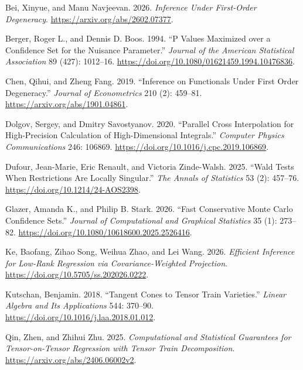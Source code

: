 \documentclass[
  11pt,
]{article}
\newlength{\cslhangindent}
\newenvironment{CSLReferences}[2] %
 {\begin{list}{}{%
  \setlength{\itemindent}{0pt}
  \setlength{\leftmargin}{0pt}
  \setlength{\parsep}{0pt}
  \ifodd #1
   \setlength{\leftmargin}{\cslhangindent}
   \setlength{\itemindent}{-1\cslhangindent}
  \fi
  \setlength{\itemsep}{#2\baselineskip}}}
 {\end{list}}
\begin{document}
\protect{}\label{refs}
\begin{CSLReferences}{1}{1}
Bei, Xinyue, and Manu Navjeevan. 2026. \emph{Inference Under First-Order
Degeneracy}. \url{https://arxiv.org/abs/2602.07377}.

Berger, Roger L., and Dennis D. Boos. 1994. {``P Values Maximized over a
Confidence Set for the Nuisance Parameter.''} \emph{Journal of the
American Statistical Association} 89 (427): 1012--16.
\url{https://doi.org/10.1080/01621459.1994.10476836}.

Chen, Qihui, and Zheng Fang. 2019. {``Inference on Functionals Under
First Order Degeneracy.''} \emph{Journal of Econometrics} 210 (2):
459--81. \url{https://arxiv.org/abs/1901.04861}.

Dolgov, Sergey, and Dmitry Savostyanov. 2020. {``Parallel Cross
Interpolation for High-Precision Calculation of High-Dimensional
Integrals.''} \emph{Computer Physics Communications} 246: 106869.
\url{https://doi.org/10.1016/j.cpc.2019.106869}.

Dufour, Jean-Marie, Eric Renault, and Victoria Zinde-Walsh. 2025.
{``Wald Tests When Restrictions Are Locally Singular.''} \emph{The
Annals of Statistics} 53 (2): 457--76.
\url{https://doi.org/10.1214/24-AOS2398}.

Glazer, Amanda K., and Philip B. Stark. 2026. {``Fast Conservative Monte
Carlo Confidence Sets.''} \emph{Journal of Computational and Graphical
Statistics} 35 (1): 273--82.
\url{https://doi.org/10.1080/10618600.2025.2526416}.

Ke, Baofang, Zihao Song, Weihua Zhao, and Lei Wang. 2026.
\emph{Efficient Inference for Low-Rank Regression via
Covariance-Weighted Projection}.
\url{https://doi.org/10.5705/ss.202026.0222}.

Kutschan, Benjamin. 2018. {``Tangent Cones to Tensor Train Varieties.''}
\emph{Linear Algebra and Its Applications} 544: 370--90.
\url{https://doi.org/10.1016/j.laa.2018.01.012}.

Qin, Zhen, and Zhihui Zhu. 2025. \emph{Computational and Statistical
Guarantees for Tensor-on-Tensor Regression with Tensor Train
Decomposition}. \url{https://arxiv.org/abs/2406.06002v2}.


\end{CSLReferences}
\end{document}
